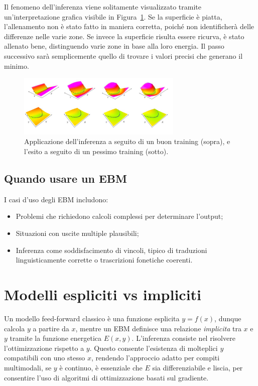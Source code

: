 Il fenomeno dell'inferenza viene solitamente visualizzato tramite un'interpretazione grafica visibile in Figura~\ref{fig:InfGoodBad}. Se la superficie è piatta, l'allenamento non è stato fatto in maniera corretta, poiché non identificherà delle differenze nelle varie zone. Se invece la superficie risulta essere ricurva, è stato allenato bene, distinguendo varie zone in base alla loro energia. Il passo successivo sarà semplicemente quello di trovare i valori precisi che generano il minimo.
\begin{figure}
    \centering
    \includegraphics[width=0.7\textwidth]{figure/InferenceGoodBad.png}
    \caption{Applicazione dell'inferenza a seguito di un buon training (sopra), e l'esito a seguito di un pessimo training (sotto).}
    \label{fig:InfGoodBad}
\end{figure}

\subsection{Quando usare un EBM}
I casi d'uso degli EBM includono:
\begin{itemize}
    \item Problemi che richiedono calcoli complessi per determinare l'output;
    \item Situazioni con uscite multiple plausibili;
    \item Inferenza come soddisfacimento di vincoli, tipico di traduzioni linguisticamente corrette o trascrizioni fonetiche coerenti.
\end{itemize}

\section{Modelli espliciti vs impliciti}

Un modello feed-forward classico è una funzione esplicita $y = f(x)$, dunque calcola $y$ a partire da $x$, mentre un EBM definisce una relazione \textit{implicita} tra $x$ e $y$ tramite la funzione energetica $E(x, y)$. L'inferenza consiste nel risolvere l'ottimizzazione rispetto a $y$. Questo consente l'esistenza di molteplici $y$ compatibili con uno stesso $x$, rendendo l'approccio adatto per compiti multimodali, se $y$ è continuo, è essenziale che $E$ sia differenziabile e liscia, per consentire l'uso di algoritmi di ottimizzazione basati sul gradiente.

